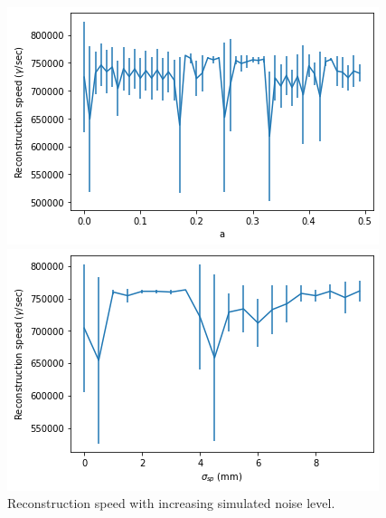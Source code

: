 \begin{figure}
        \centering
        \begin{minipage}{0.49\textwidth} \centering
        \includegraphics[width=\textwidth]{graphs/pi_enNoise_speed.png}
        \end{minipage}
        \begin{minipage}{0.49\textwidth} \centering
        \includegraphics[width=\textwidth]{graphs/pi_spNoise_speed.png}
        \end{minipage}
        \caption{Reconstruction speed with increasing simulated noise level.}
        \label{fig:sim_speed}
\end{figure}


